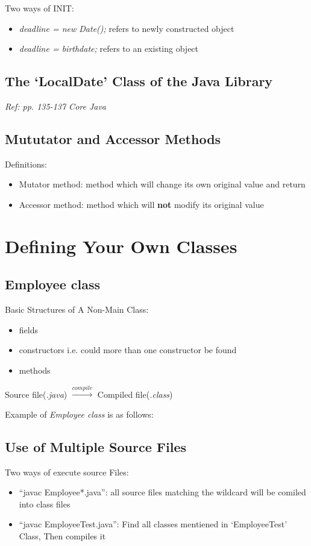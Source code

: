 \documentclass[12pt]{article}
\begin{document}
Two ways of INIT:
\begin{itemize}
    \item \textit{deadline = new Date();} refers to newly constructed object
    \item \textit{deadline = birthdate;} refers to an existing object
\end{itemize}

\subsection{The `LocalDate' Class of the Java Library}
\textit{Ref: pp. 135-137 Core Java}
\subsection{Mututator and Accessor Methods}
Definitions:
\begin{itemize}
    \item Mutator method: method which will change its own original value and return
    \item Accessor method: method which will \textbf{not} modify its original value  
\end{itemize}

\section{Defining Your Own Classes}
\subsection{Employee class}
Basic Structures of A Non-Main Class:
\begin{itemize}
    \item fields
    \item constructors i.e. could more than one constructor be found 
    \item methods
\end{itemize}

Source file(\textit{.java}) $\xrightarrow{compile}$ Compiled file(\textit{.class})

Example of \emph{Employee class} is as follows:


\subsection{Use of Multiple Source Files}
Two ways of execute source Files:
\begin{itemize}
    \item ``javac Employee*.java'': all source files matching the wildcard will be comiled into class files
    \item ``javac EmployeeTest.java'': Find all classes mentiened in `EmployeeTest' Class, Then compiles it
\end{itemize}
\end{document}
